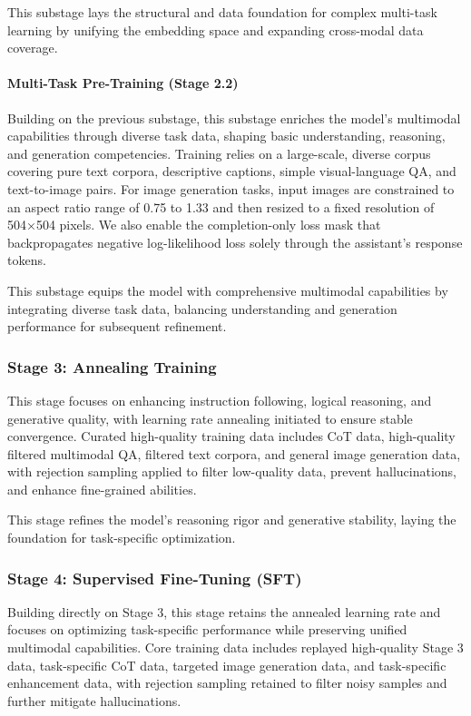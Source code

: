 \documentclass[11pt, a4paper, logo, copyright]{googledeepmind}
\begin{document}
This substage lays the structural and data foundation for complex multi-task learning by unifying the embedding space and expanding cross-modal data coverage.

\paragraph{Multi-Task Pre-Training (Stage 2.2) }
Building on the previous substage, this substage enriches the model’s multimodal capabilities through diverse task data, shaping basic understanding, reasoning, and generation competencies. Training relies on a large-scale, diverse corpus covering pure text corpora, descriptive captions, simple visual-language QA, and text-to-image pairs.
%
For image generation tasks, input images are constrained to an aspect ratio range of 0.75 to 1.33 and then resized to a fixed resolution of 504×504 pixels. We also enable the completion-only loss mask that backpropagates negative log-likelihood loss solely through the assistant’s response tokens. %

This substage equips the model with comprehensive multimodal capabilities by integrating diverse task data, balancing understanding and generation performance for subsequent refinement.

\subsubsection{Stage 3: Annealing Training}
This stage focuses on enhancing instruction following, logical reasoning, and generative quality, with learning rate annealing initiated to ensure stable convergence. Curated high-quality training data includes CoT data, high-quality filtered multimodal QA, filtered text corpora, and general image generation data, with rejection sampling applied to filter low-quality data, prevent hallucinations, and enhance fine-grained abilities.

This stage refines the model’s reasoning rigor and generative stability, laying the foundation for task-specific optimization.

\subsubsection{Stage 4: Supervised Fine-Tuning (SFT)}
Building directly on Stage 3, this stage retains the annealed learning rate and focuses on optimizing task-specific performance while preserving unified multimodal capabilities. Core training data includes replayed high-quality Stage 3 data, task-specific CoT data, targeted image generation data, and task-specific enhancement data, with rejection sampling retained to filter noisy samples and further mitigate hallucinations.
\end{document}
